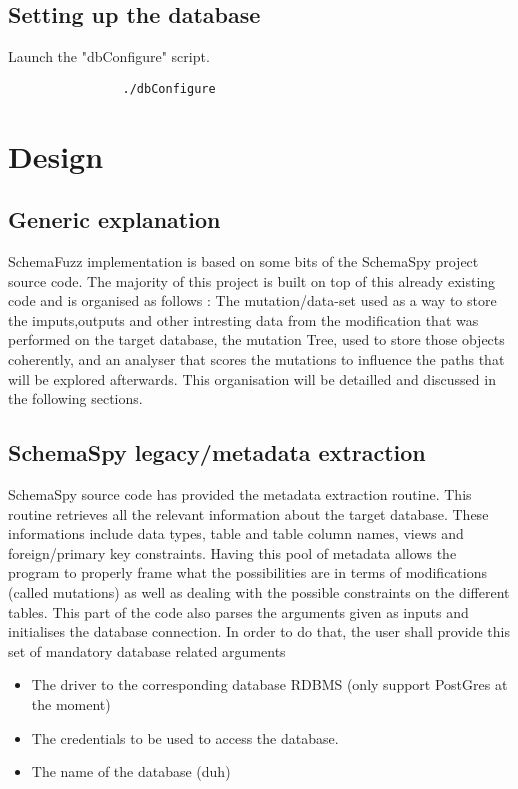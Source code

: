 \documentclass{article}
\begin{document}
		\subsection{Setting up the database}	
	
Launch the "dbConfigure" script.
			\begin{verbatim}
				./dbConfigure
			\end{verbatim}		 
		
	\section{Design}
		\subsection{Generic explanation}
SchemaFuzz implementation is based on some bits of the SchemaSpy project source code.
The majority of this project is built on top of this already existing code and is organised as follows :
The mutation/data-set used as a way to store the imputs,outputs and other intresting data from the modification that was performed on the target database,
the mutation Tree, used to store those objects coherently, and an analyser that scores the mutations to influence the paths that will be explored afterwards. This organisation will be detailled and discussed in the following sections.
		\subsection{SchemaSpy legacy/metadata extraction}
SchemaSpy source code has provided the metadata extraction routine. This routine retrieves all the relevant information about the target database. These informations include data types, table and table column names, views and foreign/primary key constraints. Having this pool of metadata allows the program to properly frame what the possibilities are in terms of modifications (called mutations) as well as dealing with the possible constraints on the different tables. 
This part of the code also parses the arguments given as inputs and initialises the database connection.
In order to do that, the user shall provide this set of mandatory database related arguments
			\begin{itemize}
 				\item The driver to the corresponding database RDBMS (only support PostGres at the moment)
 				\item The credentials to be used to access the database.
 				\item The name of the database (duh)
			\end{itemize}
\end{document}

